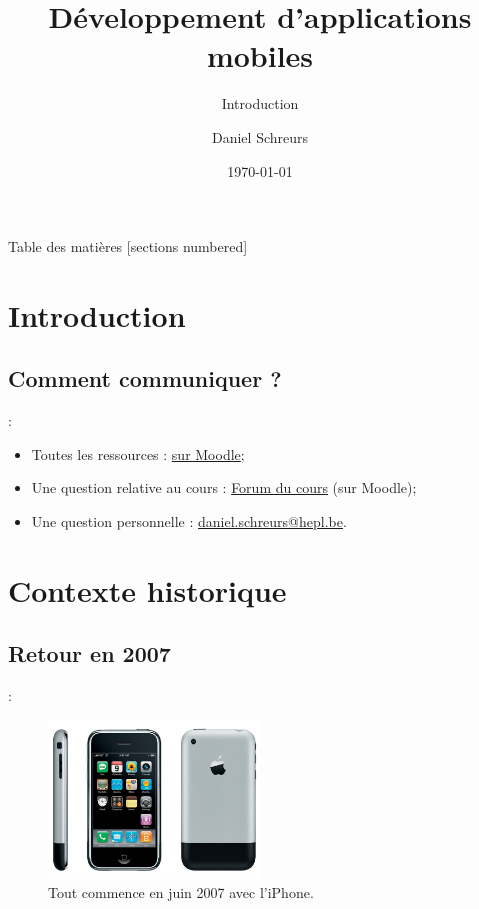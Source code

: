 \documentclass[10pt]{beamer}
\title{Développement d'applications mobiles}
\subtitle{Introduction}
\date{\today}
\author{Daniel Schreurs}
\institute{Haute École de la Province de Liège}
\begin{document}
\maketitle

\begin{frame}[allowframebreaks]{Table des matières}
    [sections numbered]
    \tableofcontents
\end{frame}

\section{Introduction}

\subsection{Comment communiquer ?}
\begin{frame}{\secname : \subsecname}
    \begin{itemize}
        \item Toutes les ressources : \href{https://moodle.ecolevirtuelle.be/course/view.php?id=29711}{sur Moodle};
        \item Une question relative au cours : \href{https://moodle.ecolevirtuelle.be/mod/forum/view.php?id=175496}{Forum du cours} (sur Moodle);
        \item Une question personnelle : \href{mailto:daniel.schreurs@hepl.be}{daniel.schreurs@hepl.be}.
    \end{itemize}
\end{frame}

\section{Contexte historique}
\subsection{Retour en 2007}
\begin{frame}[fragile,t]{\secname : \subsecname}
    \begin{figure}
        \begin{center}
            \includegraphics[width=0.5\textwidth]{../assets/img/Originele-iPhone.jpg}
            \caption*{Tout commence en juin 2007 avec l'iPhone.}
            \label{Fig:Originele-iPhone}
        \end{center}
    \end{figure}
\end{frame}
\end{document}
